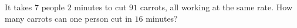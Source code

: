 It takes $7$ people $2$ minutes to cut $91$ carrots, all working at the same rate. How many carrots can one person cut in $16$ minutes?
